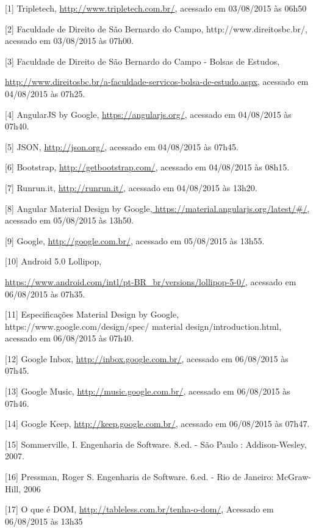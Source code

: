 \documentclass[
  12pt,				%
  openany,
  oneside,
  a4paper,			%
  english,			%
  brazil
]{article}
\numberwithin{figure}{section}
\numberwithin{table}{section}
\begin{document}


[1] Tripletech, \url{http://www.tripletech.com.br/}, acessado em 03/08/2015 às 06h50

[2] Faculdade de Direito de São Bernardo do Campo, http://www.direitosbc.br/, acessado em 03/08/2015 às 07h00.

[3] Faculdade de Direito de São Bernardo do Campo - Bolsas de Estudos,

\url{http://www.direitosbc.br/a-faculdade-servicos-bolsa-de-estudo.aspx}, acessado em 04/08/2015 às 07h25.

[4] AngularJS by Google, \url{https://angularjs.org/}, acessado em 04/08/2015 às 07h40.

[5] JSON, \url{http://json.org/}, acessado em 04/08/2015 às 07h45.

[6] Bootstrap, \url{http://getbootstrap.com/}, acessado em 04/08/2015 às 08h15.

[7] Runrun.it, \url{http://runrun.it/}, acessado em 04/08/2015 às 13h20.

[8] Angular Material Design by Google,\url{ https://material.angularjs.org/latest/\#/}, acessado em 05/08/2015 às 13h50.

[9] Google, \url{http://google.com.br/}, acessado em 05/08/2015 às 13h55.

[10] Android 5.0 Lollipop,

\url{https://www.android.com/intl/pt-BR_br/versions/lollipop-5-0/},
acessado em 06/08/2015 às 07h35.

[11] Especificações Material Design by Google, https://www.google.com/design/spec/ material design/introduction.html, acessado em 06/08/2015 às 07h40.

[12] Google Inbox, \url{http://inbox.google.com.br/}, acessado em 06/08/2015 às 07h45.

[13] Google Music, \url{http://music.google.com.br/}, acessado em 06/08/2015 às 07h46.

[14] Google Keep, \url{http://keep.google.com.br/}, acessado em 06/08/2015 às 07h47.

[15] Sommerville, I. Engenharia de Software. 8.ed. - São Paulo : Addison-Wesley, 2007.

[16] Pressman, Roger S. Engenharia de Software. 6.ed. - Rio de Janeiro: McGraw-Hill, 2006

[17] O que é DOM, \url{http://tableless.com.br/tenha-o-dom/}, Acessado em 06/08/2015 às 13h35
\end{document}
